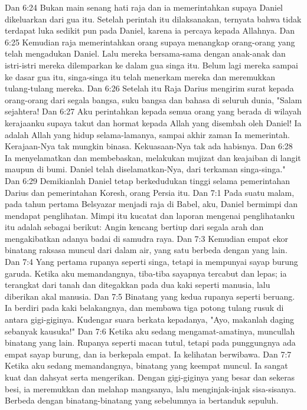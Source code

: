 Dan 6:24  Bukan main senang hati raja dan ia memerintahkan supaya Daniel dikeluarkan dari gua itu. Setelah perintah itu dilaksanakan, ternyata bahwa tidak terdapat luka sedikit pun pada Daniel, karena ia percaya kepada Allahnya.
Dan 6:25  Kemudian raja memerintahkan orang supaya menangkap orang-orang yang telah mengadukan Daniel. Lalu mereka bersama-sama dengan anak-anak dan istri-istri mereka dilemparkan ke dalam gua singa itu. Belum lagi mereka sampai ke dasar gua itu, singa-singa itu telah menerkam mereka dan meremukkan tulang-tulang mereka.
Dan 6:26  Setelah itu Raja Darius mengirim surat kepada orang-orang dari segala bangsa, suku bangsa dan bahasa di seluruh dunia, "Salam sejahtera!
Dan 6:27  Aku perintahkan kepada semua orang yang berada di wilayah kerajaanku supaya takut dan hormat kepada Allah yang disembah oleh Daniel! Ia adalah Allah yang hidup selama-lamanya, sampai akhir zaman Ia memerintah. Kerajaan-Nya tak mungkin binasa. Kekuasaan-Nya tak ada habisnya.
Dan 6:28  Ia menyelamatkan dan membebaskan, melakukan mujizat dan keajaiban di langit maupun di bumi. Daniel telah diselamatkan-Nya, dari terkaman singa-singa."
Dan 6:29  Demikianlah Daniel tetap berkedudukan tinggi selama pemerintahan Darius dan pemerintahan Koresh, orang Persia itu.
Dan 7:1  Pada suatu malam, pada tahun pertama Belsyazar menjadi raja di Babel, aku, Daniel bermimpi dan mendapat penglihatan. Mimpi itu kucatat dan laporan mengenai penglihatanku itu adalah sebagai berikut: Angin kencang bertiup dari segala arah dan mengakibatkan adanya badai di samudra raya.
Dan 7:3  Kemudian empat ekor binatang raksasa muncul dari dalam air, yang satu berbeda dengan yang lain.
Dan 7:4  Yang pertama rupanya seperti singa, tetapi ia mempunyai sayap burung garuda. Ketika aku memandangnya, tiba-tiba sayapnya tercabut dan lepas; ia terangkat dari tanah dan ditegakkan pada dua kaki seperti manusia, lalu diberikan akal manusia.
Dan 7:5  Binatang yang kedua rupanya seperti beruang. Ia berdiri pada kaki belakangnya, dan membawa tiga potong tulang rusuk di antara gigi-giginya. Kudengar suara berkata kepadanya, "Ayo, makanlah daging sebanyak kausuka!"
Dan 7:6  Ketika aku sedang mengamat-amatinya, muncullah binatang yang lain. Rupanya seperti macan tutul, tetapi pada punggungnya ada empat sayap burung, dan ia berkepala empat. Ia kelihatan berwibawa.
Dan 7:7  Ketika aku sedang memandangnya, binatang yang keempat muncul. Ia sangat kuat dan dahsyat serta mengerikan. Dengan gigi-giginya yang besar dan sekeras besi, ia meremukkan dan melahap mangsanya, lalu menginjak-injak sisa-sisanya. Berbeda dengan binatang-binatang yang sebelumnya ia bertanduk sepuluh.
